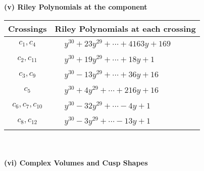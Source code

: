 \documentclass[1p]{elsarticle_modified}
\theoremstyle{definition}
\begin{document}
\newpage\renewcommand{\arraystretch}{1}
\flushleft \textbf{(v) Riley Polynomials at the component}\newline \\
\begin{tabular}{m{50pt}|m{274pt}}
Crossings & \hspace{64pt}Riley Polynomials at each crossing \\
\hline $$\begin{aligned}c_{1},c_{4}\end{aligned}$$&$\begin{aligned}
&y^{30}+23 y^{29}+\cdots+4163 y+169
\end{aligned}$\\
\hline $$\begin{aligned}c_{2},c_{11}\end{aligned}$$&$\begin{aligned}
&y^{30}+19 y^{29}+\cdots+18 y+1
\end{aligned}$\\
\hline $$\begin{aligned}c_{3},c_{9}\end{aligned}$$&$\begin{aligned}
&y^{30}-13 y^{29}+\cdots+36 y+16
\end{aligned}$\\
\hline $$\begin{aligned}c_{5}\end{aligned}$$&$\begin{aligned}
&y^{30}+4 y^{29}+\cdots+216 y+16
\end{aligned}$\\
\hline $$\begin{aligned}c_{6},c_{7},c_{10}\end{aligned}$$&$\begin{aligned}
&y^{30}-32 y^{29}+\cdots-4 y+1
\end{aligned}$\\
\hline $$\begin{aligned}c_{8},c_{12}\end{aligned}$$&$\begin{aligned}
&y^{30}-3 y^{29}+\cdots-13 y+1
\end{aligned}$\\
\hline
\end{tabular}\\~\\
\newpage\flushleft \textbf{(vi) Complex Volumes and Cusp Shapes}
\end{document}
